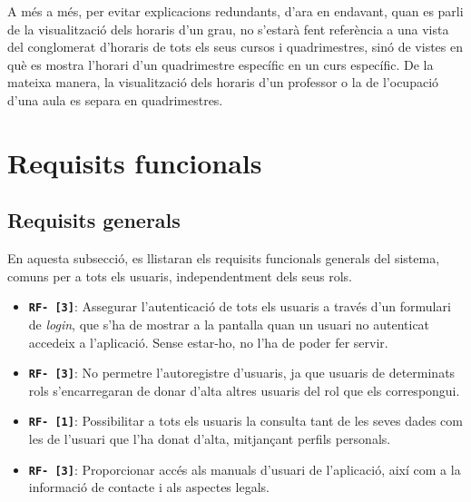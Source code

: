 \documentclass[a4paper,12pt]{ThesisStyle}
\begin{document}

A més a més, per evitar explicacions redundants, d'ara en endavant, quan es parli de la visualització dels horaris d'un grau, no s'estarà fent referència a una vista del conglomerat d'horaris de tots els seus cursos i quadrimestres, sinó de vistes en què es mostra l'horari d'un quadrimestre específic en un curs específic. De la mateixa manera, la visualització dels horaris d'un professor o la de l'ocupació d'una aula es separa en quadrimestres.

\section{Requisits funcionals}
\label{sec:requisits_funcionals}

\subsection{Requisits generals}
\label{subsec:requisits_generals} %

En aquesta subsecció, es llistaran els requisits funcionals generals del sistema, comuns per a tots els usuaris, independentment dels seus rols.

\begin{itemize}
  \item \texttt{\textbf{RF- [3]}}: Assegurar l'autenticació de tots els usuaris a través d'un formulari de \emph{login}, que s'ha de mostrar a la pantalla quan un usuari no autenticat accedeix a l'aplicació. Sense estar-ho, no l'ha de poder fer servir.
  \item \texttt{\textbf{RF- [3]}}: No permetre l'autoregistre d'usuaris, ja que usuaris de determinats rols s'encarregaran de donar d'alta altres usuaris del rol que els correspongui.
  \item \texttt{\textbf{RF- [1]}}: Possibilitar a tots els usuaris la consulta tant de les seves dades com les de l'usuari que l'ha donat d'alta, mitjançant perfils personals.
  \item \texttt{\textbf{RF- [3]}}: Proporcionar accés als manuals d'usuari de l'aplicació, així com a la informació de contacte i als aspectes legals.
\end{itemize}
\end{document}
